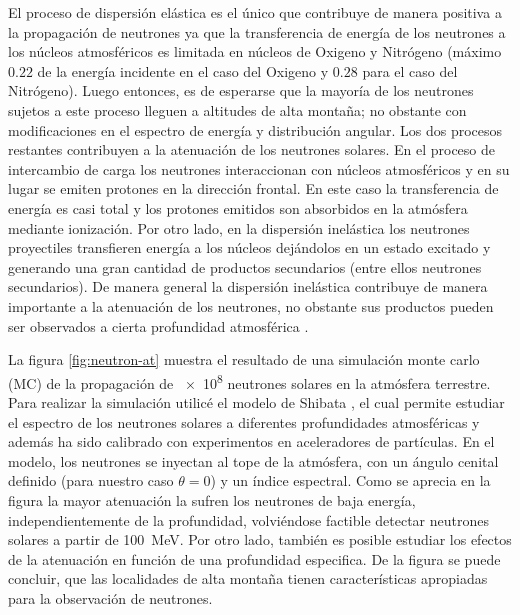 El proceso de dispersión elástica es el único que contribuye de manera positiva a la propagación de neutrones ya que la transferencia de energía de los neutrones a los núcleos atmosféricos es limitada en núcleos de Oxigeno y Nitrógeno (máximo $0.22$ de la energía incidente en el caso del Oxigeno y $0.28$ para el caso del Nitrógeno). Luego entonces, es de esperarse que la mayoría de los neutrones sujetos a este proceso lleguen a altitudes de alta montaña; no obstante con modificaciones en el espectro de energía y distribución angular. Los dos procesos restantes contribuyen a la atenuación de los neutrones solares. En el proceso de intercambio de carga los neutrones interaccionan con núcleos atmosféricos y en su lugar se emiten protones en la dirección frontal. En este caso la transferencia de energía es casi total y los protones emitidos son absorbidos en la atmósfera mediante ionización. Por otro lado, en la dispersión inelástica los neutrones proyectiles transfieren energía a los núcleos dejándolos en un estado excitado y generando una gran cantidad de productos secundarios (entre ellos neutrones secundarios). De manera general la dispersión inelástica contribuye de manera importante a la atenuación de los neutrones, no obstante sus productos pueden ser observados a cierta profundidad atmosférica \cite{shibata94}.

La figura \ref{fig:neutron-at} muestra el resultado de una simulación monte carlo (MC) de la propagación de \num{e8} neutrones solares en la atmósfera terrestre. Para realizar la simulación utilicé el modelo de Shibata \cite{shibata94}, el cual permite estudiar el espectro de los neutrones solares a diferentes profundidades atmosféricas y además ha sido calibrado con experimentos en aceleradores de partículas. En el modelo, los neutrones se inyectan al tope de la atmósfera, con un ángulo cenital definido (para nuestro caso $\theta=0$) y un índice espectral. Como se aprecia en la figura la mayor atenuación la sufren los neutrones de baja energía, independientemente de la profundidad, volviéndose factible detectar neutrones solares a partir de \SI{100}{\mega\electronvolt}. Por otro lado, también es posible estudiar los efectos de la atenuación en función de una profundidad especifica. De la figura se puede concluir, que las localidades de alta montaña tienen características apropiadas para la observación de neutrones.

